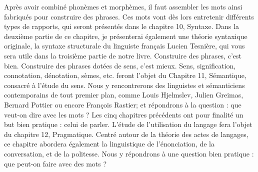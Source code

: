 Après avoir combiné phonèmes et morphèmes, il faut assembler les mots ainsi fabriqués pour construire des phrases. Ces mots vont dès lors entretenir différents types de rapports, qui seront présentés dans le chapitre 10, Syntaxe. Dans la deuxième partie de ce chapitre, je présenterai également une théorie syntaxique originale, la syntaxe structurale du linguiste français Lucien Tesnière, qui vous sera utile dans la troisième partie de notre livre.
Construire des phrases, c’est bien. Construire des phrases dotées de sens, c’est mieux. Sens, signification, connotation, dénotation, sèmes, etc. feront l’objet du Chapitre 11, Sémantique, consacré à l’étude du sens. Nous y rencontrerons des linguistes et sémanticiens contemporains de tout premier plan, comme Louis Hjelmslev, Julien Greimas, Bernard Pottier ou encore François Rastier; et répondrons à la question : que veut-on dire avec les mots ?
Les cinq chapitres précédents ont pour finalité un but bien pratique : celui de parler. L’étude de l’utilisation du langage fera l’objet du chapitre 12, Pragmatique. Centré autour de la théorie des actes de langages, ce chapitre abordera également la linguistique de l’énonciation, de la conversation, et de la politesse. Nous y répondrons à une question bien pratique : que peut-on faire avec des mots ?
